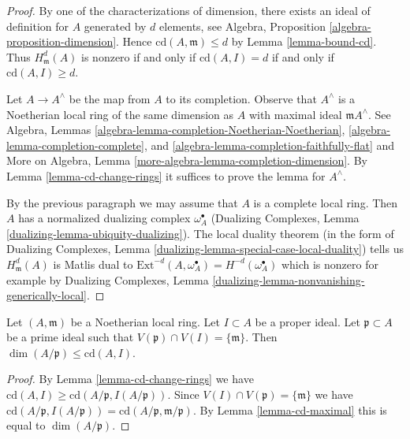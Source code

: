 \begin{proof}
By one of the characterizations of dimension, there exists
an ideal of definition for $A$ generated by $d$ elements, see
Algebra, Proposition \ref{algebra-proposition-dimension}.
Hence $\text{cd}(A, \mathfrak m) \leq d$ by
Lemma \ref{lemma-bound-cd}. Thus $H^d_\mathfrak m(A)$ is
nonzero if and only if $\text{cd}(A, I) = d$ if and only if
$\text{cd}(A, I) \geq d$.

\medskip\noindent
Let $A \to A^\wedge$ be the map from $A$ to its completion.
Observe that $A^\wedge$ is a Noetherian local ring of the
same dimension as $A$ with maximal ideal $\mathfrak m A^\wedge$.
See Algebra, Lemmas
\ref{algebra-lemma-completion-Noetherian-Noetherian},
\ref{algebra-lemma-completion-complete}, and
\ref{algebra-lemma-completion-faithfully-flat} and
More on Algebra, Lemma \ref{more-algebra-lemma-completion-dimension}.
By Lemma \ref{lemma-cd-change-rings}
it suffices to prove the lemma for $A^\wedge$.

\medskip\noindent
By the previous paragraph we may assume that $A$ is
a complete local ring. Then $A$ has a normalized dualizing complex
$\omega_A^\bullet$ (Dualizing Complexes, Lemma
\ref{dualizing-lemma-ubiquity-dualizing}).
The local duality theorem (in the form of
Dualizing Complexes, Lemma \ref{dualizing-lemma-special-case-local-duality})
tells us $H^d_\mathfrak m(A)$ is Matlis dual to
$\text{Ext}^{-d}(A, \omega_A^\bullet) = H^{-d}(\omega_A^\bullet)$
which is nonzero for example by
Dualizing Complexes, Lemma
\ref{dualizing-lemma-nonvanishing-generically-local}.
\end{proof}

\begin{lemma}
\label{lemma-cd-bound-dim-local}
Let $(A, \mathfrak m)$ be a Noetherian local ring.
Let $I \subset A$ be a proper ideal.
Let $\mathfrak p \subset A$ be a prime ideal
such that $V(\mathfrak p) \cap V(I) = \{\mathfrak m\}$.
Then $\dim(A/\mathfrak p) \leq \text{cd}(A, I)$.
\end{lemma}

\begin{proof}
By Lemma \ref{lemma-cd-change-rings} we have
$\text{cd}(A, I) \geq \text{cd}(A/\mathfrak p, I(A/\mathfrak p))$.
Since $V(I) \cap V(\mathfrak p) = \{\mathfrak m\}$ we have
$\text{cd}(A/\mathfrak p, I(A/\mathfrak p)) =
\text{cd}(A/\mathfrak p, \mathfrak m/\mathfrak p)$.
By Lemma \ref{lemma-cd-maximal} this is equal to $\dim(A/\mathfrak p)$.
\end{proof}








